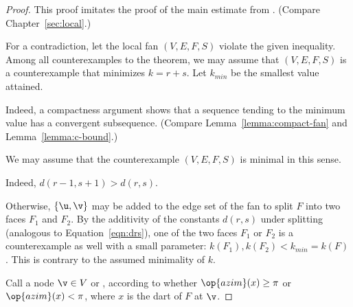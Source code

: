 \begin{proof} This proof imitates the proof of the main estimate from
  \cite{Hales:2006:DCG}.   (Compare
  Chapter~\ref{sec:local}.)

  For a contradiction, let the local fan $(V,E,F,S)$ violate the given
  inequality.  Among all counterexamples to the theorem, we may assume
  that $(V,E,F,S)$ is a counterexample that minimizes $k=r+s$.  Let
  $k_{min}$ be the smallest value attained.



    Indeed, a compactness argument shows that a sequence
tending to the minimum value has a convergent subsequence.  (Compare
Lemma~\ref{lemma:compact-fan} and Lemma~\ref{lemma:c-bound}.)

We may assume that the counterexample $(V,E,F,S)$ is minimal
in this sense.

  Indeed, $d(r-1,s+1)>d(r,s)$.

  Otherwise, $\{\u,\v\}$ may be added to the edge
set of the fan to split $F$ into two faces $F_1$ and $F_2$.
By the additivity of the constants $d(r,s)$ under splitting (analogous
to Equation~\ref{eqn:drs}), one of the two faces $F_1$ or $F_2$ is a
counterexample as well with a small parameter:
$k(F_1),k(F_2)<k_{min}=k(F)$.  This is contrary to the assumed
minimality of $k$.



Call a node $\v\in V$  or , according
to whether $\op{azim}(x)\ge\pi$ or $\op{azim}(x)<\pi$, where $x$ is
the dart of $F$ at $\v$.  %
%


\end{proof}
